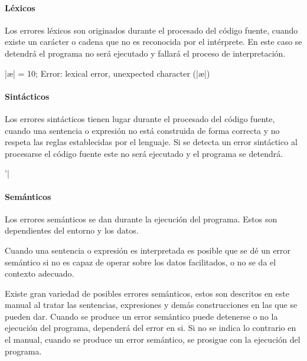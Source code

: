 \paragraph {Léxicos} 
Los errores léxicos son originados durante el procesado del código fuente, cuando existe un carácter o cadena que no es reconocida por el intérprete. En este caso 
se detendrá el programa no será ejecutado y fallará el proceso de interpretación. \\

\begin{myverbatim}
   |æ| = 10;
   Error: lexical error, unexpected character (|æ|)
\end{myverbatim}

\paragraph {Sintácticos}
Los errores sintácticos tienen lugar durante el procesado del código fuente, cuando una sentencia o expresión no está construida de forma correcta y no respeta las reglas establecidas por el 
lenguaje. Si se detecta un error sintáctico al procesarse el código fuente este no será ejecutado y el programa se detendrá. \\

\begin{myverbatim}
   '|
\end{myverbatim}

\paragraph {Semánticos} 
Los errores semánticos se dan durante la ejecución del programa. Estos son dependientes del entorno y los datos. 

Cuando una sentencia o expresión es interpretada es posible que se dé un error semántico si no es capaz de operar sobre los datos
facilitados, o no se da el contexto adecuado. 

Existe gran variedad de posibles errores semánticos, estos son descritos en este manual al tratar las sentencias, expresiones y demás construcciones en las que se 
pueden dar. Cuando se produce un error semántico puede detenerse o no la ejecución del programa, dependerá del error en si. Si no se indica lo contrario en
el manual, cuando se produce un error semántico, se prosigue con la ejecución del programa. \\

